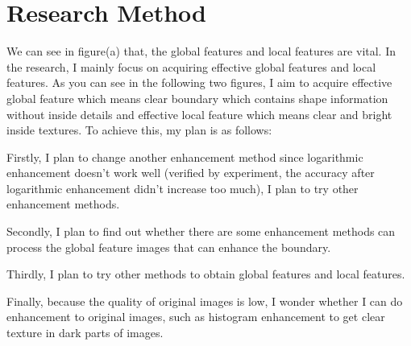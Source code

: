 \documentclass{article}
\begin{document}
\section{Research Method}
We can see in figure(a) that, the global features and local features are vital. In the research, I mainly focus on acquiring effective global features and local features. As you can see in the following two figures, I aim to acquire effective global feature which means clear boundary which contains shape information without inside details and effective local feature which means clear and bright inside textures. To achieve this, my plan is as follows:

Firstly, I plan to change another enhancement method since logarithmic enhancement doesn't work well (verified by experiment, the accuracy after logarithmic enhancement didn't increase too much), I plan to try other enhancement methods. 
 
Secondly, I plan to find out whether there are some enhancement methods can process the global feature images that can enhance the boundary. 

Thirdly, I plan to try other methods to obtain global features and local features. 

Finally, because the quality of original images is low, I wonder whether I can do enhancement to original images, such as histogram enhancement to get clear texture in dark parts of images.

\begin{figure}[!ht] 
  \centering 
  \hspace{0.3in} 
\end{figure}

\begin{figure}[!ht] 
  \centering 
  \hspace{0.3in} 
\end{figure}
\end{document}
